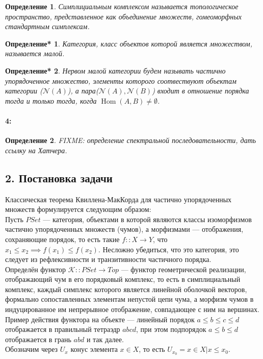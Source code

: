 \documentclass[a4paper,12pt]{report}
\newtheorem{definition}{Определение}
\newtheorem{definition*}{Определение*}
\begin{document}
\begin{definition}
Симплициальным комплексом называется топологическое пространство, представленное как объединение множеств, гомеоморфных стандартным симплексам.
\end{definition}

\begin{definition*}
Категория, класс объектов которой является множеством, называется малой.
\end{definition*}

\begin{definition*}
Нервом малой категории будем называть частично упорядоченное множество, элементы которого соотвествуют объектам категории ($\mathcal{N}(A)$), а пара($\mathcal{N}(A),\mathcal{N}(B)$) входит в отношение порядка тогда и только тогда, когда $\operatorname{Hom}(A,B) \neq \emptyset$.
\end{definition*}

\paragraph*{4:}
\begin{definition}
  FIXME: определение спектральной последовательности, дать ссылку на Хатчера.
\end{definition}

\subsection*{2. Постановка задачи}
Классическая теорема Квиллена-МакКорда для частично упорядоченных множеств формулируется следующим образом:\\

Пусть $PSet$ --- категория, объектами в которой являются классы изоморфизмов частично упорядоченных множеств (чумов), а морфизмами --- отображения, сохраняющие порядок, то есть такие $f :: X \to Y$, что $x_1 \leq x_2 \implies f(x_1) \leq f(x_2)$. Несложно убедиться, что это категория, это следует из рефлексивности и транзитивности частичного порядка.\\
Определён функтор $\mathcal{K} :: PSet \to Top$ --- функтор геометрической реализации, отображающий чум в его порядковый комплекс, то есть в симплициальный комплекс, каждый симплекс которого является линейной оболочкой векторов, формально сопоставленных элементам непустой цепи чума, а морфизм чумов в индуцированное им непрерывное отображение, совпадающее с ним на вершинах.\\
Пример действия функтора на объекте --- линейный порядок $a \leq b \leq c \leq d$ отображается в правильный тетраэдр $abcd$, при этом подпорядок $a \leq b \leq d$ отображается в грань $abd$ и так далее.\\
Обозначим через $U_x$ конус элемента $x \in X$, то есть $U_{x_0} = {x \in X | x \leq x_0}$.\\
\end{document}
